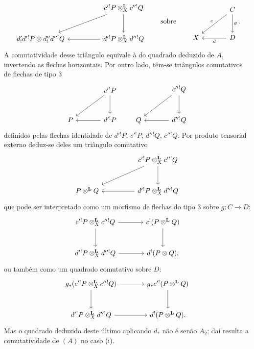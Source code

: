 \begin{prooftext}[Demonstração]
\[\begin{tikzcd}[column sep=huge,row sep=large]
& c'{}^!P\otimes_X^{\mathbf L}c''{}^!Q \arrow[d] \arrow[dl]\\
d'_!d'{}^!P\otimes d''_!d''{}^!Q &
d'{}^!P\otimes_X^{\mathbf L}d''{}^!Q\arrow[l]
\end{tikzcd}
\qquad\text{sobre}\qquad
\begin{tikzcd}[column sep=large,row sep=large]
& C\arrow[d,"g"]\arrow[dl,"c"']\\
X & D\arrow[l,"d"]
\end{tikzcd}.
\]
A comutatividade desse triângulo equivale à do quadrado deduzido de $A_1$ invertendo as flechas horizontais. Por outro lado, têm-se triângulos comutativos de flechas de tipo $3$
\[
\begin{tikzcd}[column sep=large,row sep=large]
& c'{}^!P \arrow[d]\arrow[dl]\\
P & d'{}^!P\arrow[l]
\end{tikzcd}
\qquad
\begin{tikzcd}[column sep=large,row sep=large]
& c''{}^!Q \arrow[d]\arrow[dl]\\
Q & d''{}^!Q\arrow[l]
\end{tikzcd}
\]
definidos pelas flechas identidade de $d'{}^!P$, $c'{}^!P$, $d''{}^!Q$, $c''{}^!Q$. Por produto tensorial externo deduz-se deles um triângulo comutativo
\[
\begin{tikzcd}[column sep=huge,row sep=large]
& c'{}^!P\otimes_X^{\mathbf L}c''{}^!Q \arrow[d]\arrow[dl]\\
P\otimes^{\mathbf L}Q & d'{}^!P\otimes_X^{\mathbf L}d''{}^!Q\arrow[l]
\end{tikzcd}
\]
que pode ser interpretado como um morfismo de flechas do tipo $3$ sobre $g:C\longrightarrow D$:
\[
\begin{tikzcd}[column sep=large,row sep=large]
c'{}^!P\otimes_X^{\mathbf L}c''{}^!Q \arrow[r]\arrow[d] &
c^!(P\otimes^{\mathbf L}Q)\arrow[d]\\
d'{}^!P\otimes_X^{\mathbf L}d''{}^!Q \arrow[r] &
d^!(P\otimes Q),
\end{tikzcd}
\]
ou também como um quadrado comutativo sobre $D$:
\[
\begin{tikzcd}[column sep=large,row sep=large]
g_*(c'{}^!P\otimes_X^{\mathbf L}c''{}^!Q) \arrow[r]\arrow[d] &
g_*c'{}^!(P\otimes^{\mathbf L}Q)\arrow[d]\\
d'{}^!P\otimes_X^{\mathbf L}d''{}^!Q \arrow[r] &
d^!(P\otimes^{\mathbf L}Q).
\end{tikzcd}
\]
Mas o quadrado deduzido deste último aplicando $d_*$ não é senão $A_2$; daí resulta a comutatividade de $(A)$ no caso (i).


\end{prooftext}
